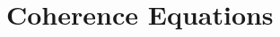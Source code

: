 \documentclass[11pt, one side, article]{memoir}
\theoremstyle{definition}
\theoremstyle{plain}
\newtheorem{theorem}[definitionx]{Theorem}
\newcommand{\0}{\textsf{0}}
\newcommand{\1}{\tn{\textsf{1}}}
\newcommand{\bnote}[1]{{\color{red}Brandon says:}~#1\quad{\color{red}$\lozenge$}}
\begin{document}
%
%
%
%
%




\appendix
\chapter{Coherence Equations}\label{coherences}
\end{document}
